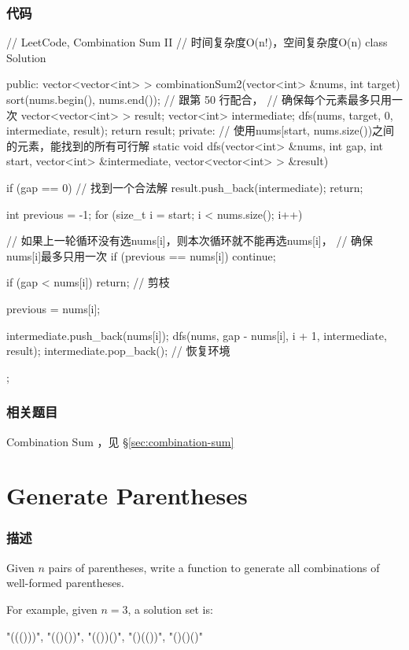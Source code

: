 \subsubsection{代码}
\begin{Code}
	// LeetCode, Combination Sum II
	// 时间复杂度O(n!)，空间复杂度O(n)
	class Solution {
		public:
		vector<vector<int> > combinationSum2(vector<int> &nums, int target) {
			sort(nums.begin(), nums.end()); // 跟第 50 行配合，
			// 确保每个元素最多只用一次
			vector<vector<int> > result;
			vector<int> intermediate;
			dfs(nums, target, 0, intermediate, result);
			return result;
		}
		private:
		// 使用nums[start, nums.size())之间的元素，能找到的所有可行解
		static void dfs(vector<int> &nums, int gap, int start,
		vector<int> &intermediate, vector<vector<int> > &result) {
			if (gap == 0) {  //  找到一个合法解
				result.push_back(intermediate);
				return;
			}
			
			int previous = -1;
			for (size_t i = start; i < nums.size(); i++) {
				// 如果上一轮循环没有选nums[i]，则本次循环就不能再选nums[i]，
				// 确保nums[i]最多只用一次
				if (previous == nums[i]) continue;
				
				if (gap < nums[i]) return;  // 剪枝
				
				previous = nums[i];
				
				intermediate.push_back(nums[i]);
				dfs(nums, gap - nums[i], i + 1, intermediate, result);
				intermediate.pop_back();  // 恢复环境
			}
		}
	};
\end{Code}


\subsubsection{相关题目}
\begindot
\item Combination Sum ，见 \S \ref{sec:combination-sum}
\myenddot


\section{Generate Parentheses } %
\label{sec:generate-parentheses}


\subsubsection{描述}
Given $n$ pairs of parentheses, write a function to generate all combinations of well-formed parentheses.

For example, given $n = 3$, a solution set is:
\begin{Code}
	"((()))", "(()())", "(())()", "()(())", "()()()"
\end{Code}

